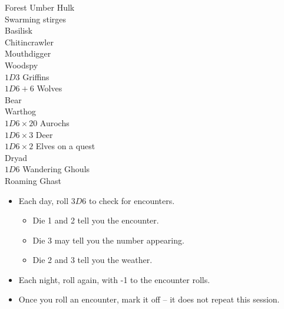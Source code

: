 \begin{multicols}{2}

\begin{encChart}{Forest}
  \encLine Umber Hulk \\
  \encLine Swarming stirges \\
  \encLine Basilisk \\
  \encLine Chitincrawler \\
  \encLine Mouthdigger \\
  \encLine Woodspy \\
  \encLine $1D3$ Griffins \\
  \encLine $1D6+6$ Wolves \\
  \encLine Bear \\
  \encLine Warthog \\
  \encLine $1D6\times 20$ Aurochs \\
  \encLine $1D6\times 3$ Deer \\
  \encLine $1D6\times 2$ Elves on a quest \\
  \encLine Dryad \\
  \encLine $1D6$ Wandering Ghouls \\
  \encLine Roaming Ghast \\
\end{encChart}

\begin{itemize}
  \item
  Each day, roll $3D6$ to check for encounters.
  \begin{itemize}
    \item
    Die 1 and 2 tell you the encounter.
    \item
    Die 3 may tell you the number appearing.
    \item
    Die 2 and 3 tell you the weather.
  \end{itemize}
  \item
  Each night, roll again, with -1 to the encounter rolls.
  \item
  Once you roll an encounter, mark it off -- it does not repeat this session.
\end{itemize}


\end{multicols}
